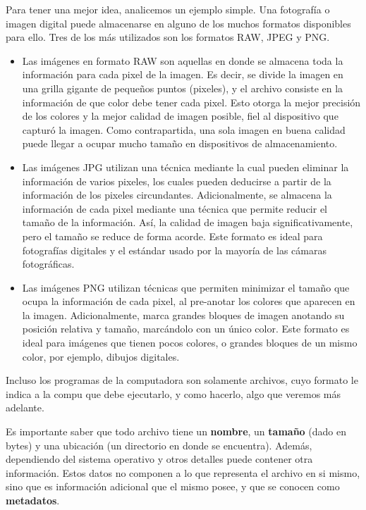 Para tener una mejor idea, analicemos un ejemplo simple. Una fotografía o imagen
digital puede almacenarse en alguno de los muchos formatos disponibles para
ello. Tres de los más utilizados son los formatos RAW, JPEG y PNG.
\begin{itemize}
    \item Las imágenes en formato RAW son aquellas en donde se almacena toda la
        información para cada pixel de la imagen. Es decir, se divide la imagen
        en una grilla gigante de pequeños puntos (pixeles), y el archivo
        consiste en la información de que color debe tener cada pixel. Esto
        otorga la mejor precisión de los colores y la mejor calidad de imagen
        posible, fiel al dispositivo que capturó la imagen. Como contrapartida,
        una sola imagen en buena calidad puede llegar a ocupar mucho tamaño en
        dispositivos de almacenamiento.
    \item Las imágenes JPG utilizan una técnica mediante la cual pueden eliminar
        la información de varios pixeles, los cuales pueden deducirse a partir
        de la información de los pixeles circundantes. Adicionalmente, se
        almacena la información de cada pixel mediante una técnica que permite
        reducir el tamaño de la información. Así, la calidad de imagen baja
        significativamente, pero el tamaño se reduce de forma acorde. Este
        formato es ideal para fotografías digitales y el estándar usado por la
        mayoría de las cámaras fotográficas.
    \item Las imágenes PNG utilizan técnicas que permiten minimizar el tamaño
        que ocupa la información de cada pixel, al pre-anotar los colores que
        aparecen en la imagen. Adicionalmente, marca grandes bloques de imagen
        anotando su posición relativa y tamaño, marcándolo con un único color.
        Este formato es ideal para imágenes que tienen pocos colores, o grandes
        bloques de un mismo color, por ejemplo, dibujos digitales.
\end{itemize}

Incluso los programas de la computadora son solamente archivos, cuyo formato le
indica a la compu que debe ejecutarlo, y como hacerlo, algo que veremos más
adelante.

Es importante saber que todo archivo tiene un \textbf{nombre}, un
\textbf{tamaño} (dado en bytes) y una ubicación (un directorio en donde se
encuentra). Además, dependiendo del sistema operativo y otros detalles puede
contener otra información. Estos datos no componen a lo que representa el
archivo en si mismo, sino que es información adicional que el mismo posee, y que
se conocen como \textbf{metadatos}.

